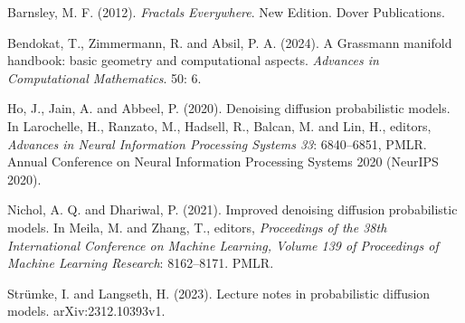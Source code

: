 \begin{bookreferences}
  \item Barnsley, M. F. (2012). \textit{Fractals Everywhere}. New Edition. Dover Publications.
  \item Bendokat, T., Zimmermann, R. and Absil, P. A. (2024). A Grassmann manifold handbook: basic geometry and computational aspects. \textit{Advances in Computational Mathematics}. 50: 6.
  \item Ho, J., Jain, A. and Abbeel, P. (2020). Denoising diffusion probabilistic models. In Larochelle, H., Ranzato, M., Hadsell, R., Balcan, M. and Lin, H., editors, \textit{Advances in Neural Information Processing Systems 33}: 6840–6851, PMLR. Annual Conference on Neural Information Processing Systems 2020 (NeurIPS 2020).
  \item Nichol, A. Q. and Dhariwal, P. (2021). Improved denoising diffusion probabilistic models. In Meila, M. and Zhang, T., editors, \textit{Proceedings of the 38th International Conference on Machine Learning, Volume 139 of Proceedings of Machine Learning Research}: 8162–8171. PMLR.
  \item Strümke, I. and Langseth, H. (2023). Lecture notes in probabilistic diffusion models. arXiv:2312.10393v1.
\end{bookreferences}

